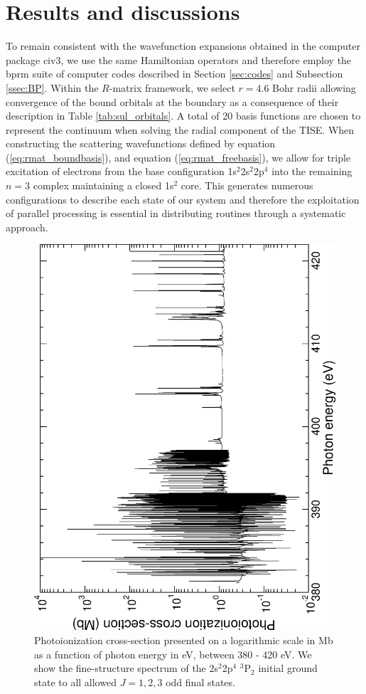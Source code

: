 \section{Results and discussions}\label{sec:sul_results}
To remain consistent with the wavefunction expansions obtained in the computer package {\sc civ3}, we use the same Hamiltonian operators and therefore employ the {\sc bprm} suite of computer codes described in Section \ref{sec:codes} and Subsection \ref{ssec:BP}. Within the $R$-matrix framework, we select $r=4.6$ Bohr radii allowing convergence of the bound orbitals at the boundary as a consequence of their description in Table \ref{tab:sul_orbitals}. A total of 20 basis functions are chosen to represent the continuum when solving the radial component of the TISE. When constructing the scattering wavefunctions defined by equation (\ref{eq:rmat_boundbasis}), and equation (\ref{eq:rmat_freebasis}), we allow for triple excitation of electrons from the base configuration 1s$^2$2s$^2$2p$^4$ into the remaining $n=3$ complex maintaining a closed 1s$^2$ core. This generates numerous configurations to describe each state of our system and therefore the exploitation of parallel processing is essential in distributing routines through a systematic approach. 


\begin{figure}[hbt]
\includegraphics[scale=0.55, angle=-90]{Figures/Sulphur/ground/ground.eps}
\caption{Photoionization cross-section presented on a logarithmic scale in Mb as a function of photon energy in eV, between 380 - 420 eV. We show the fine-structure spectrum of the 2s$^2$2p$^4$ $^3$P$_2$ initial ground state to all allowed $J=1,2,3$ odd final states.\label{fig:sul_ground}}
\end{figure}

